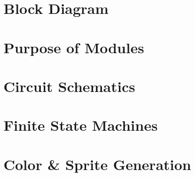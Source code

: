 \documentclass[journal, twocolumn, final,11pt,letterpaper]{IEEEtran}
\begin{document}
%

\section{Block Diagram} 
 
 
\section{Purpose of Modules}
	
\section{Circuit Schematics}

\section{Finite State Machines}

\section{Color \& Sprite Generation}
\end{document}
